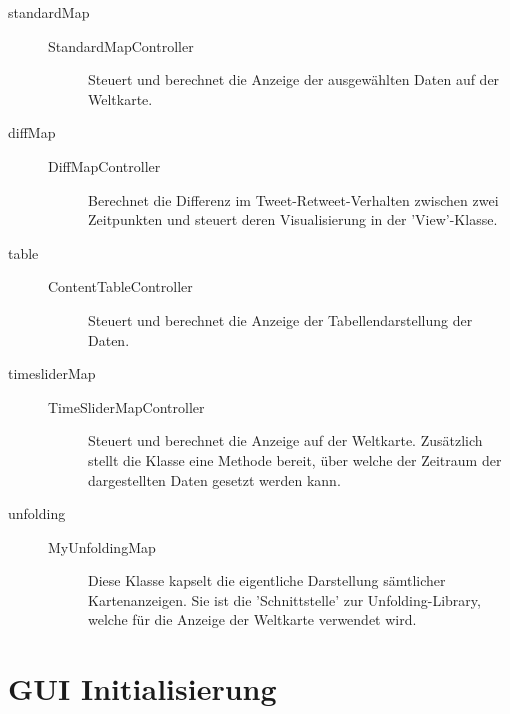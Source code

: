 \begin{description}
    \item[standardMap] \quad
	    \begin{description}
	    	\item [StandardMapController] Steuert und berechnet die Anzeige der ausgewählten Daten auf der Weltkarte.
	    \end{description}
	\item[diffMap] \quad
		\begin{description}
			\item [DiffMapController] Berechnet die Differenz im Tweet-Retweet-Verhalten zwischen zwei Zeitpunkten und steuert deren Visualisierung in der 'View'-Klasse.
		\end{description}
    \item[table] \quad
	    \begin{description}
	    	\item [ContentTableController] Steuert und berechnet die Anzeige der Tabellendarstellung der Daten.
	    \end{description}
    \item[timesliderMap] \quad
	    \begin{description}
	    	\item [TimeSliderMapController] Steuert und berechnet die Anzeige auf der Weltkarte. Zusätzlich stellt die Klasse eine Methode bereit, über welche der Zeitraum der dargestellten Daten gesetzt werden kann.
	    \end{description}
	\item[unfolding] \quad
		\begin{description}
			\item [MyUnfoldingMap] Diese Klasse kapselt die eigentliche Darstellung sämtlicher Kartenanzeigen. Sie ist die 'Schnittstelle' zur Unfolding-Library, welche für die Anzeige der Weltkarte verwendet wird.
		\end{description}
	
\end{description}
\section{GUI Initialisierung}

